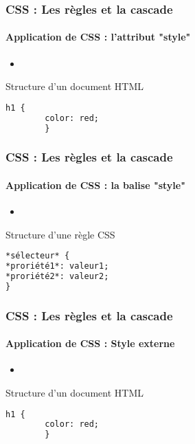 \documentclass[xcolor=table]{beamer}
\begin{document}
\begin{frame}[fragile]
\frametitle{CSS : Les règles et la cascade}
\framesubtitle{Application de CSS : l'attribut "style"}

\begin{minipage}{0.60\textwidth} 
	\begin{itemize}
		\item 
	\end{itemize}
\end{minipage}
%
\begin{minipage}{0.38\textwidth}
	\begin{block}{Structure d'un document HTML}
		\lstset{escapeinside=**}
		\scriptsize\bfseries
		\begin{lstlisting}[language={html}]
		h1 {
		color: red;
		}
		\end{lstlisting}
	\end{block}
\end{minipage}
\end{frame}

\begin{frame}[fragile]
\frametitle{CSS : Les règles et la cascade}
\framesubtitle{Application de CSS : la balise "style"}

\begin{minipage}{0.60\textwidth} 
	\begin{itemize}
		\item 
	\end{itemize}
\end{minipage}
%
\begin{minipage}{0.38\textwidth}
\begin{exampleblock}{Structure d'une règle CSS}
\lstset{escapeinside=**}
\scriptsize\bfseries
\begin{lstlisting}[language={html}]
*sélecteur* {
*proriété1*: valeur1;
*proriété2*: valeur2;
}
\end{lstlisting}
\end{exampleblock}
\end{minipage}
\end{frame}

\begin{frame}[fragile]
\frametitle{CSS : Les règles et la cascade}
\framesubtitle{Application de CSS : Style externe}

\begin{minipage}{0.60\textwidth} 
	\begin{itemize}
		\item 
	\end{itemize}
\end{minipage}
%
\begin{minipage}{0.38\textwidth}
	\begin{block}{Structure d'un document HTML}
		\lstset{escapeinside=**}
		\scriptsize\bfseries
		\begin{lstlisting}[language={html}]
		h1 {
		color: red;
		}
		\end{lstlisting}
	\end{block}
\end{minipage}
\end{frame}
\end{document}
